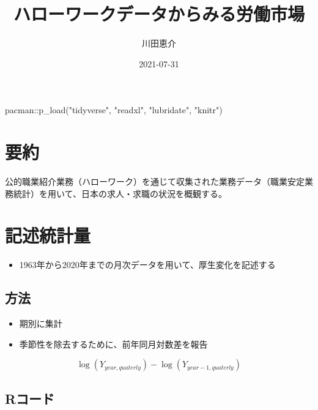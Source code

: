 \documentclass[
]{book}
\title{ハローワークデータからみる労働市場}
\author{川田恵介}
\date{2021-07-31}
\newenvironment{Shaded}{\begin{snugshade}}{\end{snugshade}}
\newcommand{\FunctionTok}[1]{\textcolor[rgb]{0.00,0.00,0.00}{#1}}
\newcommand{\NormalTok}[1]{#1}
\newcommand{\SpecialCharTok}[1]{\textcolor[rgb]{0.00,0.00,0.00}{#1}}
\newcommand{\StringTok}[1]{\textcolor[rgb]{0.31,0.60,0.02}{#1}}
\providecommand{\tightlist}{%
  \setlength{\itemsep}{0pt}\setlength{\parskip}{0pt}}
\begin{document}
\maketitle

{
\setcounter{tocdepth}{1}
\tableofcontents
}
\begin{Shaded}
\begin{Highlighting}[]
\NormalTok{pacman}\SpecialCharTok{::}\FunctionTok{p\_load}\NormalTok{(}\StringTok{"tidyverse"}\NormalTok{,}
               \StringTok{"readxl"}\NormalTok{,}
               \StringTok{"lubridate"}\NormalTok{,}
               \StringTok{"knitr"}\NormalTok{)}
\end{Highlighting}
\end{Shaded}

\hypertarget{ux8981ux7d04}{%
\chapter{要約}\label{ux8981ux7d04}}

公的職業紹介業務（ハローワーク）を通じて収集された業務データ（職業安定業務統計）を用いて、日本の求人・求職の状況を概観する。

\hypertarget{ux8a18ux8ff0ux7d71ux8a08ux91cf}{%
\chapter{記述統計量}\label{ux8a18ux8ff0ux7d71ux8a08ux91cf}}

\begin{itemize}
\tightlist
\item
  1963年から2020年までの月次データを用いて、厚生変化を記述する
\end{itemize}

\hypertarget{ux65b9ux6cd5}{%
\section{方法}\label{ux65b9ux6cd5}}

\begin{itemize}
\item
  期別に集計
\item
  季節性を除去するために、前年同月対数差を報告
\end{itemize}

\[\log(Y_{year,quaterly})-\log(Y_{year-1,quaterly})\]

\hypertarget{rux30b3ux30fcux30c9}{%
\section{Rコード}\label{rux30b3ux30fcux30c9}}
\end{document}
